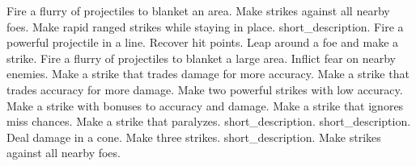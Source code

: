 \begin{spelllist}
 Fire a flurry of projectiles to blanket an area.
 Make strikes against all nearby foes.
 Make rapid ranged strikes while staying in place.
 short_description.
 Fire a powerful projectile in a line.
 Recover hit points.
 Leap around a foe and make a strike.
 Fire a flurry of projectiles to blanket a large area.
 Inflict fear on nearby enemies.
 Make a strike that trades damage for more accuracy.
 Make a strike that trades accuracy for more damage.
 Make two powerful strikes with low accuracy.
 Make a strike with bonuses to accuracy and damage.
 Make a strike that ignores miss chances.
 Make a strike that paralyzes.
 short_description.
 short_description.
 Deal damage in a cone.
 Make three strikes.
 short_description.
 Make strikes against all nearby foes.
\end{spelllist}
